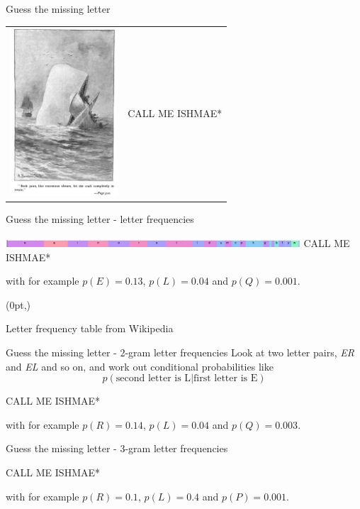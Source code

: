 \documentclass{beamer}
\newcommand\FrameText[1]{%
  \begin{textblock*}{\paperwidth}(0pt,\textheight)
    \raggedright #1\hspace{.5em}
  \end{textblock*}}
\newcommand{\crish}{\color{reddish}}
\newcommand{\cbla}{\color{black}}
\newcommand{\cred}{\color{red}}
\newcommand{\cblu}{\color{blue}}
\begin{document}
\begin{frame}{Guess the missing letter}
  \begin{tabular}{lc}
    \includegraphics[width=4cm]{Moby_Dick.jpg}&\cred{}CALL ME ISHMAE*\cbla{}
  \end{tabular}
  \end{frame}


\begin{frame}{Guess the missing letter - letter frequencies}
  \begin{center}
    \includegraphics[width=11cm]{freq.png}
  \vskip 1cm
    \cred{}CALL ME ISHMAE\cblu{}*\cbla{}
  \end{center}
  with for example \crish$p(E)=0.13$\cbla{}, \crish$p(L)=0.04$\cbla{} and \crish$p(Q)=0.001$\cbla{}. 
  \FrameText{\tiny{Letter frequency table from Wikipedia}}  
  \end{frame}


\begin{frame}{Guess the missing letter - 2-gram letter frequencies}
  Look at two letter pairs, \textsl{ER} and \textsl{EL} and so on, and
  work out conditional probabilities like \crish$$ p(\mbox{second
    letter is L}|\mbox{first letter is E})
  $$\cbla{}
  \begin{center}
    \cred{}CALL ME ISHMA\cblu{}E*\cbla{}
  \end{center}
  with for example \crish$p(R)=0.14$\cbla{}, \crish$p(L)=0.04$\cbla{} and \crish$p(Q)=0.003$\cbla{}. 
  \end{frame}


\begin{frame}{Guess the missing letter - 3-gram letter frequencies}


    \begin{center}
    \cred{}CALL ME ISHM\cblu{}AE*\cbla{}
  \end{center}
  with for example \crish$p(R)=0.1$\cbla{}, \crish$p(L)=0.4$\cbla{} and \crish$p(P)=0.001$\cbla{}. 
  \end{frame}
\end{document}
